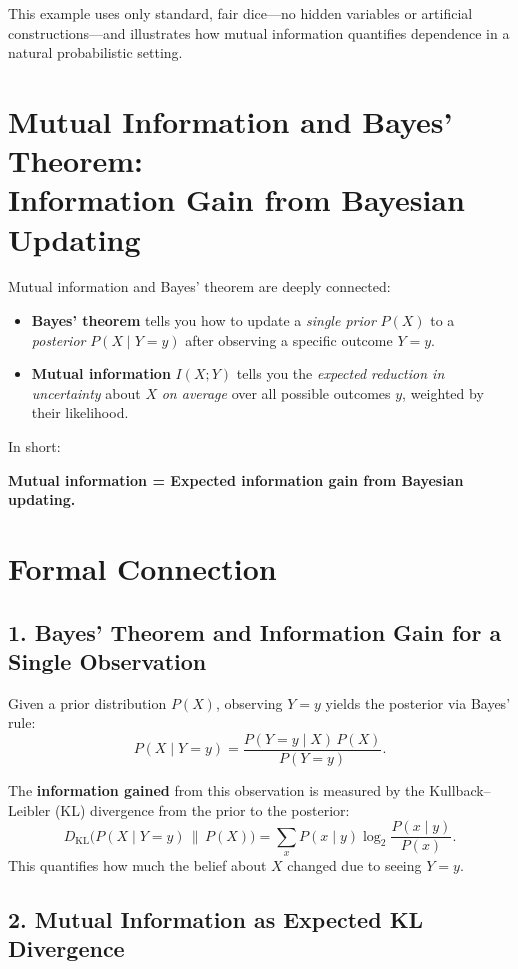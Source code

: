 \documentclass{article}
\begin{document}
This example uses only standard, fair dice—no hidden variables or artificial constructions—and illustrates how mutual information quantifies dependence in a natural probabilistic setting.




\section*{Mutual Information and Bayes' Theorem: \\ Information Gain from Bayesian Updating}

Mutual information and Bayes' theorem are deeply connected:
\begin{itemize}
\item \textbf{Bayes' theorem} tells you how to update a \emph{single prior} \(P(X)\) to a \emph{posterior} \(P(X \mid Y = y)\) after observing a specific outcome \(Y = y\).
    \item \textbf{Mutual information} \(I(X;Y)\) tells you the \emph{expected reduction in uncertainty} about \(X\) \emph{on average} over all possible outcomes \(y\), weighted by their likelihood.
\end{itemize}


In short:
\begin{center}
    \textbf{Mutual information = Expected information gain from Bayesian updating.}
\end{center}

\section*{Formal Connection}

\subsection*{1. Bayes' Theorem and Information Gain for a Single Observation}

Given a prior distribution \(P(X)\), observing \(Y = y\) yields the posterior via Bayes' rule:
\[
P(X \mid Y = y) = \frac{P(Y = y \mid X)\, P(X)}{P(Y = y)}.
\]

The \textbf{information gained} from this observation is measured by the Kullback–Leibler (KL) divergence from the prior to the posterior:
\[
D_{\mathrm{KL}}\big(P(X \mid Y = y) \,\|\, P(X)\big) 
= \sum_{x} P(x \mid y) \log_2 \frac{P(x \mid y)}{P(x)}.
\]
This quantifies how much the belief about \(X\) changed due to seeing \(Y = y\).

\subsection*{2. Mutual Information as Expected KL Divergence}
\end{document}
